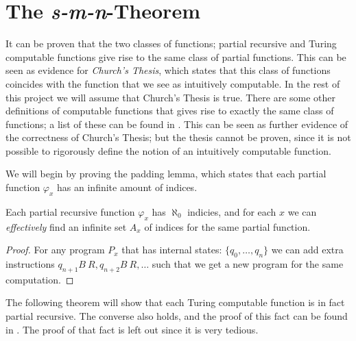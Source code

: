 \documentclass[../main.tex]{subfiles}
\begin{document}
\section{The \textit{s-m-n}-Theorem}

It can be proven that the two classes of functions; partial recursive and Turing
computable functions give rise to the same class of partial functions. This
can be seen as evidence for \textit{Church's Thesis}, which states that this
class of functions coincides with the function that we see as intuitively
computable. In the rest of this project we will assume that Church's Thesis
is true. There are some other definitions of computable functions that gives
rise to exactly the same class of functions; a list of these can be found in
\citet{Cutland1980}. This can be seen as further evidence of the correctness of
Church's Thesis; but the thesis cannot be proven, since it is not possible to
rigorously define the notion of an intuitively computable function.

We will begin by proving the padding lemma, which states that each partial
function $\varphi_x$ has an infinite amount of indices.
\begin{lem}
	Each partial recursive function $\varphi_x$ has $\aleph_0$ indicies,
	and for each $x$ we can \textit{effectively} find an infinite set $A_x$
	of indices for the same partial function.
\end{lem}
\begin{proof}
	For any program $P_x$ that has internal states: $\{q_0,\ldots, q_n\}$
	we can add extra instructions $q_{n+1}B\ R ,q_{n+2}B\ R,\ldots$ such
	that we get a new program for the same computation.
\end{proof}

The following theorem will show that each Turing computable function is in fact
partial recursive. The converse also holds, and the proof of this fact can be
found in \citet{Kleene1952}. The proof of that fact is left out since it is
very tedious.
\end{document}
